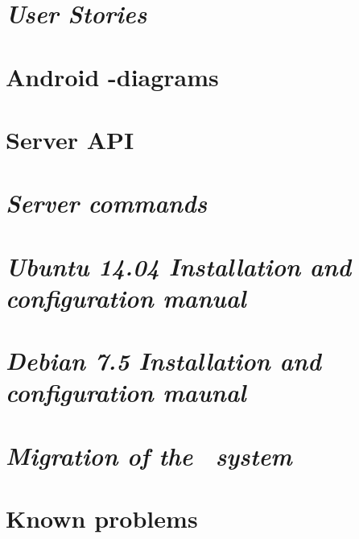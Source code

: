 \begin{appendix}

\chapter{\textit{User Stories}}

\chapter{Android -diagrams}

\chapter{Server API}

\chapter{\textit{Server commands}}

\chapter{\textit{Ubuntu 14.04 Installation and configuration manual}}

\chapter{\textit{Debian 7.5 Installation and configuration maunal}}

\chapter{\textit{Migration of the \appName\ system}}

\chapter{Known problems}
\label{chap:knownProblems}

\end{appendix}
